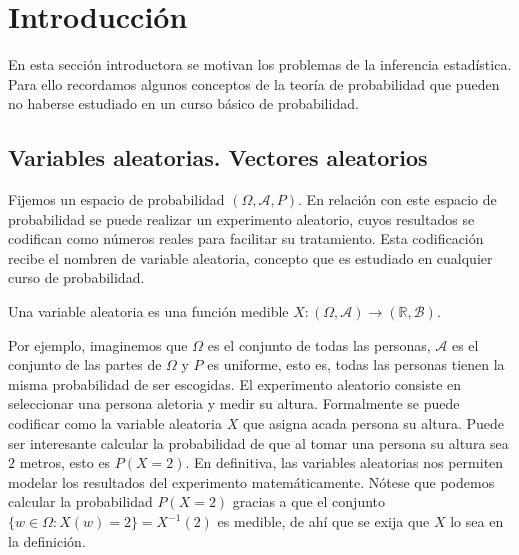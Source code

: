 

\section{Introducción}

En esta sección introductora se motivan los problemas de la inferencia estadística. Para ello recordamos algunos conceptos de la teoría de probabilidad que pueden no haberse estudiado en un curso básico de probabilidad.

\subsection{Variables aleatorias. Vectores aleatorios}

Fijemos un espacio de probabilidad $(\Omega, \mathcal{A}, P)$. En relación con este espacio de probabilidad se puede realizar un experimento aleatorio, cuyos resultados se codifican como números reales para facilitar su tratamiento. Esta codificación recibe el nombren de variable aleatoria, concepto que es estudiado en cualquier curso de probabilidad.

\begin{definition}
    Una variable aleatoria es una función medible $X: (\Omega, \mathcal{A}) \to (\mathbb{R}, \mathcal{B})$.
\end{definition}

Por ejemplo, imaginemos que $\Omega$ es el conjunto de todas las personas, $\mathcal{A}$ es el conjunto de las partes de $\Omega$ y $P$ es uniforme, esto es, todas las personas tienen la misma probabilidad de ser escogidas. El experimento aleatorio consiste en seleccionar una persona aletoria y medir su altura. Formalmente se puede codificar como la variable aleatoria $X$ que asigna acada persona su altura. Puede ser interesante calcular la probabilidad de que al tomar una persona su altura sea $2$ metros, esto es $P(X = 2)$. En definitiva, las variables aleatorias nos permiten modelar los resultados del experimento matemáticamente. Nótese que podemos calcular la probabilidad $P(X = 2)$ gracias a que el conjunto $\{w \in \Omega: X(w) = 2\} = X^{-1}(2)$ es medible, de ahí que se exija que $X$ lo sea en la definición.

